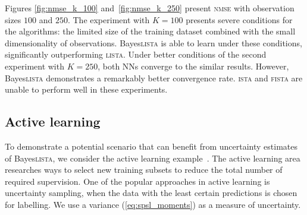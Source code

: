 \documentclass{article}
\begin{document}
  Figures \ref{fig:nmse_k_100} and~\ref{fig:nmse_k_250} present \textsc{nmse} with observation sizes $100$ and $250$. The experiment with $K=100$ presents severe conditions for the algorithms: the limited size of the training dataset combined with the small dimensionality of observations. Bayes\textsc{lista} is able to learn under these conditions, significantly outperforming \textsc{lista}. Under better conditions of the second experiment with $K=250$, both NNs converge to the similar results. However, Bayes\textsc{lista} demonstrates a remarkably better convergence rate. \textsc{ista} and \textsc{fista} are unable to perform well in these experiments.


  \subsection{Active learning}
  To demonstrate a potential scenario that can benefit from uncertainty estimates of Bayes\textsc{lista}, we consider the active learning example~\cite{settles.tr09}. The active learning area researches ways to select new training subsets to reduce the total number of required supervision. One of the popular approaches in active learning is uncertainty sampling, when the data with the least certain predictions is chosen for labelling. We use a variance (\ref{eq:spsl_moments}) as a measure of uncertainty.
\end{document}
